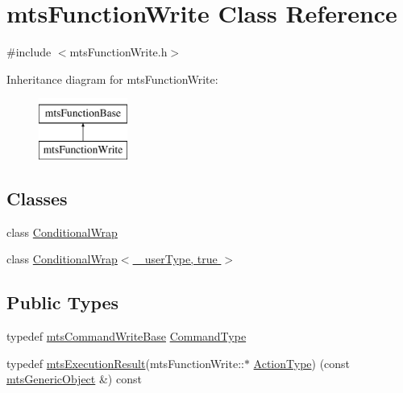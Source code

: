 \hypertarget{classmts_function_write}{}\section{mts\+Function\+Write Class Reference}
\label{classmts_function_write}


{\ttfamily \#include $<$mts\+Function\+Write.\+h$>$}

Inheritance diagram for mts\+Function\+Write\+:\begin{figure}[H]
\begin{center}
\leavevmode
\includegraphics[height=2.000000cm]{d7/dc3/classmts_function_write}
\end{center}
\end{figure}
\subsection*{Classes}
\begin{DoxyCompactItemize}
\item 
class \hyperlink{classmts_function_write_1_1_conditional_wrap}{Conditional\+Wrap}
\item 
class \hyperlink{classmts_function_write_1_1_conditional_wrap_3_01__user_type_00_01true_01_4}{Conditional\+Wrap$<$ \+\_\+user\+Type, true $>$}
\end{DoxyCompactItemize}
\subsection*{Public Types}
\begin{DoxyCompactItemize}
\item 
typedef \hyperlink{classmts_command_write_base}{mts\+Command\+Write\+Base} \hyperlink{classmts_function_write_a4b81286be87adec18b358ebaa9ebb2be}{Command\+Type}
\item 
typedef \hyperlink{classmts_execution_result}{mts\+Execution\+Result}(mts\+Function\+Write\+::$\ast$ \hyperlink{classmts_function_write_acdce6b414e90dfb8c05bab5e7a2db81b}{Action\+Type}) (const \hyperlink{classmts_generic_object}{mts\+Generic\+Object} \&) const 
\end{DoxyCompactItemize}
